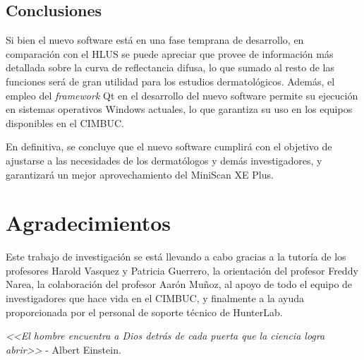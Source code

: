\documentclass[conference]{IEEEtran}
\begin{document}
	\subsection{Conclusiones}
	Si bien el nuevo software est\'{a} en una fase temprana de desarrollo, en comparaci\'{o}n con el HLUS se puede apreciar que provee de informaci\'{o}n m\'{a}s detallada sobre la curva de reflectancia difusa, lo que sumado al resto de las funciones ser\'{a} de gran utilidad para los estudios dermatol\'{o}gicos. Adem\'{a}s, el empleo del \textit{framework} Qt en el desarrollo del nuevo software permite su ejecuci\'{o}n en sistemas operativos Windows actuales, lo que garantiza su uso en los equipos disponibles en el CIMBUC.

	En definitiva, se concluye que el nuevo software cumplir\'{a} con el objetivo de ajustarse a las necesidades de los dermat\'{o}logos y dem\'{a}s investigadores, y garantizar\'{a} un mejor aprovechamiento del MiniScan XE Plus.

\section*{Agradecimientos}
	Este trabajo de investigaci\'{o}n se est\'{a} llevando a cabo gracias a la tutor\'{i}a de los profesores Harold Vasquez y Patricia \mbox{Guerrero}, la orientaci\'{o}n del profesor Freddy Narea, la colaboraci\'{o}n del profesor Aar\'{o}n Mu\~{n}oz, al apoyo de todo el equipo de investigadores que hace vida en el CIMBUC, y finalmente a la ayuda proporcionada por el personal de soporte t\'{e}cnico de HunterLab.
	
	\textit{<<El hombre encuentra a Dios detr\'{a}s de cada puerta que la ciencia logra abrir>>} - Albert Einstein.


\end{document}
